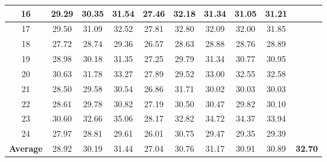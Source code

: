 \documentclass[10pt,onecolumn,letterpaper]{article}
\begin{document}
\begin{table}
\begin{center}
\begin{tabular}{|c||c|c|c|c|c|c|c|c|c|}
\\
\hline
16 & 29.29 & 30.35 & 31.54 & 27.46 & 32.18 & 31.34 & 31.05 & 31.21 & \textbf{}
\\
\hline
17 & 29.50 & 31.09 & 32.52 & 27.81 & 32.80 & 32.09 & 32.00 & 31.85 & \textbf{}
\\
\hline
18 & 27.72 & 28.74 & 29.36 & 26.57 & 28.63 & 28.88 & 28.76 & 28.89 & \textbf{}
\\
\hline
19 & 28.98 & 30.18 & 31.35 & 27.25 & 29.79 & 31.34 & 30.77 & 30.95 & \textbf{}
\\
\hline
20 & 30.63 & 31.78 & 33.27 & 27.89 & 29.52 & 33.00 & 32.55 & 32.58 & \textbf{}
\\
\hline
21 & 28.50 & 29.58 & 30.54 & 26.86 & 31.71 & 30.02 & 30.03 & 30.03 & \textbf{}
\\
\hline
22 & 28.61 & 29.78 & 30.82 & 27.19 & 30.50 & 30.47 & 29.82 & 30.10 & \textbf{}
\\
\hline
23 & 30.60 & 32.66 & 35.06 & 28.17 & 32.82 & 34.72 & 34.37 & 33.94 & \textbf{}
\\
\hline
24 & 27.97 & 28.81 & 29.61 & 26.01 & 30.75 & 29.47 & 29.35 & 29.39 & \textbf{}
\\
\hline
\textbf{Average} & 28.92 & 30.19 & 31.44 & 27.04 & 30.76 & 31.17 & 30.91 & 30.89 & \textbf{32.70}
\\
\hline
\end{tabular}
\end{center}
\vspace{-1mm}
\end{table}
\end{document}
